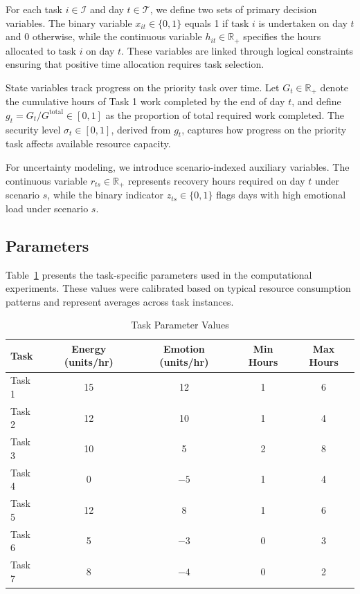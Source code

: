 \documentclass[preprint,review,11pt]{elsarticle}
\newcommand{\R}{\mathbb{R}}
\begin{document}
For each task $i \in \mathcal{I}$ and day $t \in \mathcal{T}$, we define two sets of primary decision variables. The binary variable $x_{it} \in \{0,1\}$ equals 1 if task $i$ is undertaken on day $t$ and 0 otherwise, while the continuous variable $h_{it} \in \R_+$ specifies the hours allocated to task $i$ on day $t$. These variables are linked through logical constraints ensuring that positive time allocation requires task selection.

State variables track progress on the priority task over time. Let $G_t \in \R_+$ denote the cumulative hours of Task 1 work completed by the end of day $t$, and define $g_t = G_t / G^{\text{total}} \in [0,1]$ as the proportion of total required work completed. The security level $\sigma_t \in [0,1]$, derived from $g_t$, captures how progress on the priority task affects available resource capacity.

For uncertainty modeling, we introduce scenario-indexed auxiliary variables. The continuous variable $r_{ts} \in \R_+$ represents recovery hours required on day $t$ under scenario $s$, while the binary indicator $z_{ts} \in \{0,1\}$ flags days with high emotional load under scenario $s$.

\subsection{Parameters}

Table~\ref{tab:task_params} presents the task-specific parameters used in the computational experiments. These values were calibrated based on typical resource consumption patterns and represent averages across task instances.

\begin{table}[htbp]
\centering
\caption{Task Parameter Values}
\label{tab:task_params}
\begin{tabular}{lcccc}
\toprule
Task & Energy (units/hr) & Emotion (units/hr) & Min Hours & Max Hours \\
\midrule
Task 1 & 15 & 12 & 1 & 6 \\
Task 2 & 12 & 10 & 1 & 4 \\
Task 3 & 10 & 5 & 2 & 8 \\
Task 4 & 0 & $-5$ & 1 & 4 \\
Task 5 & 12 & 8 & 1 & 6 \\
Task 6 & 5 & $-3$ & 0 & 3 \\
Task 7 & 8 & $-4$ & 0 & 2 \\
\bottomrule
\end{tabular}
\end{table}
\end{document}

